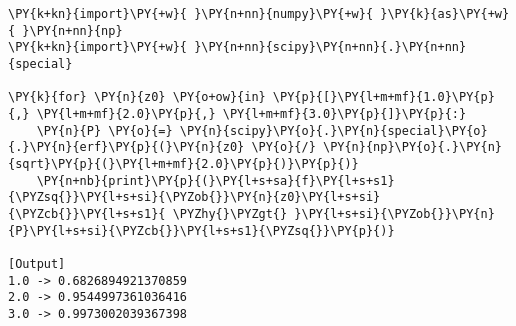 \begin{Verbatim}[label=\makebox{\href{https://github.com/unipi-physics-labs/statnotes/tree/main/snippy/scipy.special.erf.py}{https://github.com/.../scipy.special.erf.py}},commandchars=\\\{\}]
\PY{k+kn}{import}\PY{+w}{ }\PY{n+nn}{numpy}\PY{+w}{ }\PY{k}{as}\PY{+w}{ }\PY{n+nn}{np}
\PY{k+kn}{import}\PY{+w}{ }\PY{n+nn}{scipy}\PY{n+nn}{.}\PY{n+nn}{special}

\PY{k}{for} \PY{n}{z0} \PY{o+ow}{in} \PY{p}{[}\PY{l+m+mf}{1.0}\PY{p}{,} \PY{l+m+mf}{2.0}\PY{p}{,} \PY{l+m+mf}{3.0}\PY{p}{]}\PY{p}{:}
    \PY{n}{P} \PY{o}{=} \PY{n}{scipy}\PY{o}{.}\PY{n}{special}\PY{o}{.}\PY{n}{erf}\PY{p}{(}\PY{n}{z0} \PY{o}{/} \PY{n}{np}\PY{o}{.}\PY{n}{sqrt}\PY{p}{(}\PY{l+m+mf}{2.0}\PY{p}{)}\PY{p}{)}
    \PY{n+nb}{print}\PY{p}{(}\PY{l+s+sa}{f}\PY{l+s+s1}{\PYZsq{}}\PY{l+s+si}{\PYZob{}}\PY{n}{z0}\PY{l+s+si}{\PYZcb{}}\PY{l+s+s1}{ \PYZhy{}\PYZgt{} }\PY{l+s+si}{\PYZob{}}\PY{n}{P}\PY{l+s+si}{\PYZcb{}}\PY{l+s+s1}{\PYZsq{}}\PY{p}{)}

[Output]
1.0 -> 0.6826894921370859
2.0 -> 0.9544997361036416
3.0 -> 0.9973002039367398
\end{Verbatim}
